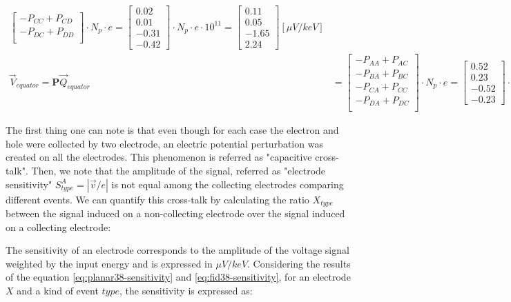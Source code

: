 \begin{align}
\begin{bmatrix}
- P_{CC} + P_{CD} \\
- P_{DC} + P_{DD} \\
\end{bmatrix}
\cdot N_p \cdot e
= 
\begin{bmatrix}
0.02 \\ 0.01 \\ -0.31 \\ -0.42
\end{bmatrix}
\cdot N_p \cdot e \cdot 10^{11}
= 
\begin{bmatrix}
0.11 \\ 0.05 \\ -1.65 \\ 2.24
\end{bmatrix}
[\mu V/keV]
\\
\vec{V}_{equator} = \bm{P} \vec{Q}_{equator} &=
\begin{bmatrix}
- P_{AA} + P_{AC} \\
- P_{BA} + P_{BC} \\
- P_{CA} + P_{CC} \\
- P_{DA} + P_{DC} \\
\end{bmatrix}
\cdot N_p \cdot e
= 
\begin{bmatrix}
0.52 \\ 0.23 \\ -0.52 \\ -0.23
\end{bmatrix}
\cdot N_p \cdot e \cdot 10^{11}
= 
\begin{bmatrix}
2.77 \\ 1.23 \\ -2.77 \\ -1.23
\end{bmatrix}
[\mu V/keV]
\end{align}

The first thing one can note is that even though for each case the electron and hole were collected by two electrode, an electric potential perturbation was created on all the electrodes. This phenomenon is referred as "capacitive cross-talk". Then, we note that the amplitude of the signal, referred as "electrode sensitivity" $S_{type}^{A} = |\vec{v}/e|$ is not equal among the collecting electrodes comparing different events. We can quantify this cross-talk by calculating the ratio $X_{type}$ between the signal induced on a non-collecting electrode over the signal induced on a collecting electrode:

The sensitivity of an electrode corresponds to the amplitude of the voltage signal weighted by the input energy and is expressed in $\mu V/keV$. Considering the results of the equation \ref{eq:planar38-sensitivity} and \ref{eq:fid38-sensitivity}, for an electrode $X$ and a kind of event $type$, the sensitivity is expressed as:

